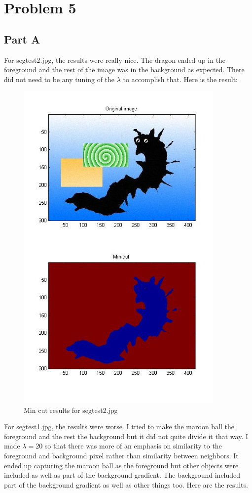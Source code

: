 \documentclass[11pt,psfig]{article}
\begin{document}
\newpage

\section*{Problem 5}

\subsection*{Part A}

For segtest2.jpg, the results were really nice. The dragon ended up in the foreground and the rest of the image was in the background as expected. There did not need to be any tuning of the $\lambda$ to accomplish that. Here is the result:

\begin{figure}[H]
\centering
\includegraphics[width=4in]{prob5plotA.jpg}
\caption{Min cut results for segtest2.jpg}
\end{figure}

For segtest1.jpg, the results were worse. I tried to make the maroon ball the foreground and the rest the background but it did not quite divide it that way. I made $\lambda=20$ so that there was more of an emphasis on similarity to the foreground and background pixel rather than similarity between neighbors. It ended up capturing the maroon ball as the foreground but other objects were included as well as part of the background gradient. The background included part of the background gradient as well as other things too. Here are the results.
\end{document}
